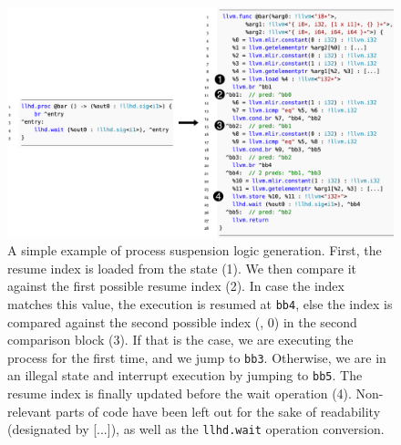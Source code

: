 \begin{figure}
    \centering
    \includegraphics[width=\textwidth]{gfx/Resumelow.png}
    \caption[A simple example of process suspension logic generation.]{A simple example of process suspension logic generation. First, the resume index is loaded from the state (1). We then compare it against the first possible resume index (2). In case the index matches this value, the execution is resumed at \texttt{bb4}, else the index is compared against the second possible index (\ie, $0$) in the second comparison block (3). If that is the case, we are executing the process for the first time, and we jump to \texttt{bb3}. Otherwise, we are in an illegal state and interrupt execution by jumping to \texttt{bb5}. The resume index is finally updated before the wait operation (4). Non-relevant parts of code have been left out for the sake of readability (designated by [...]), as well as the \texttt{llhd.wait} operation conversion.}
    \label{fig:proclow}
\end{figure}

